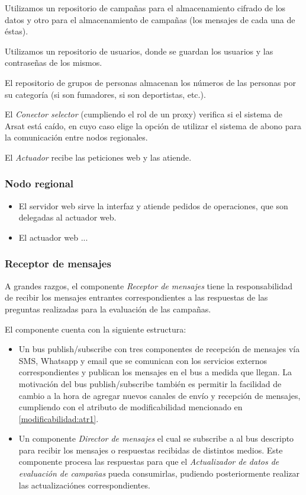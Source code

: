 \documentclass[a4paper, 10pt, twoside]{article}
\begin{document}
Utilizamos un repositorio de campañas para el almacenamiento cifrado de los datos y otro para el almacenamiento de campañas (los mensajes de cada una de éstas).

Utilizamos un repositorio de usuarios, donde se guardan los usuarios y las contraseñas de los mismos.

El repositorio de grupos de personas almacenan los números de las personas por su categoría (si son fumadores, si son deportistas, etc.).



El \textit{Conector selector} (cumpliendo el rol de un proxy) verifica si el sistema de Arsat está caído, en cuyo caso elige la opción de utilizar el sistema de abono para la comunicación entre nodos regionales.

El \textit{Actuador} recibe las peticiones web y las atiende.



\subsubsection{Nodo regional}

\begin{itemize}

  \item El servidor web sirve la interfaz y atiende pedidos de operaciones, que son delegadas al actuador web.
  \item El actuador web ...

\end{itemize}


\subsubsection{Receptor de mensajes}

A grandes razgos, el componente \textit{Receptor de mensajes} tiene la responsabilidad de recibir los mensajes entrantes correspondientes a las respuestas de las preguntas realizadas para la evaluación de las campañas.

El componente cuenta con la siguiente estructura:

\begin{itemize}
  \item Un bus publish/subscribe con tres componentes de recepción de mensajes vía SMS, Whatsapp y email que se comunican con los servicios externos correspondientes y publican los mensajes en el bus a medida que llegan. La motivación del bus publish/subscribe también es permitir la facilidad de cambio a la hora de agregar nuevos canales de envío y recepción de mensajes, cumpliendo con el atributo de modificabilidad mencionado en \ref{modificabilidad:atr1}.

  \item Un componente \textit{Director de mensajes} el cual se subscribe a al bus descripto para recibir los mensajes o respuestas recibidas de distintos medios. Este componente procesa las respuestas para que el \textit{Actualizador de datos de evaluación de campañas} pueda consumirlas, pudiendo posteriormente realizar las actualizaciónes correspondientes.

\end{itemize}
\end{document}
